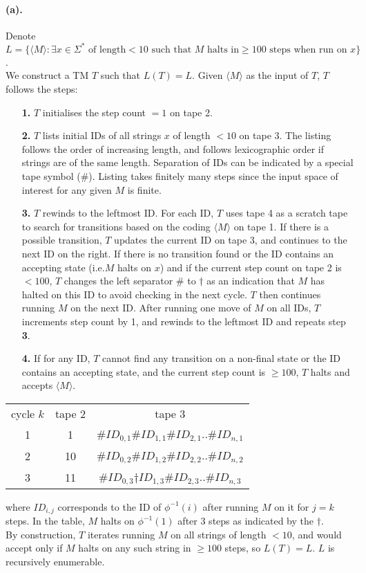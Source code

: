 \documentclass[12pt]{article}
\begin{document}
\paragraph*{(a).} Denote \(L = \{\langle M \rangle : \exists x \in \Sigma^* \text{ of length} < 10 \text{ such that } M \text{ halts in} \geq 100 \text{ steps when run on } x\}\).\\
We construct a TM \(T\) such that \(L(T) = L\). Given \(\langle M \rangle\) as the input of \(T\), \(T\) follows the steps:
\begin{enumerate}
  \item[\textbf{1.}] \(T\) initialises the step count \(= 1\) on tape 2.
  \item[\textbf{2.}] \(T\) lists initial IDs of all strings \(x\) of length \(< 10\) on tape 3. The listing follows the order of increasing length, and follows lexicographic order if strings are of the same length. Separation of IDs can be indicated by a special tape symbol (\#). Listing takes finitely many steps since the input space of interest for any given \(M\) is finite.
  \item[\textbf{3.}] \(T\) rewinds to the leftmost ID. For each ID, \(T\) uses tape 4 as a scratch tape to search for transitions based on the coding \(\langle M \rangle\) on tape 1. If there is a possible transition, \(T\) updates the current ID on tape 3, and continues to the next ID on the right. If there is no transition found or the ID contains an accepting state (i.e.\(M\) halts on \(x\)) and if the current step count on tape 2 is \(< 100\), \(T\) changes the left separator \# to \(\dagger\) as an indication that \(M\) has halted on this ID to avoid checking in the next cycle. \(T\) then continues running \(M\) on the next ID. After running one move of \(M\) on all IDs, \(T\) increments step count by 1, and rewinds to the leftmost ID and repeats step \textbf{3}. 
  \item[\textbf{4.}] If for any ID, \(T\) cannot find any transition on a non-final state or the ID contains an accepting state, and the current step count is \(\geq 100\), \(T\) halts and accepts \(\langle M \rangle\).
\end{enumerate}
\begin{center}
  \begin{tabular}{ c c c }
  cycle \(k\) & tape 2 & tape 3 \\
  1 & 1 & \#\(ID_{0,1}\)\#\(ID_{1,1}\)\#\(ID_{2,1}\)..\#\(ID_{n,1}\) \\
  2 & 10 & \#\(ID_{0,2}\)\#\(ID_{1,2}\)\#\(ID_{2,2}\)..\#\(ID_{n,2}\) \\
  3 & 11 & \#\(ID_{0,3}\)\(\dagger ID_{1,3}\)\#\(ID_{2,3}\)..\#\(ID_{n,3}\) \\
  \end{tabular}
\end{center}
where \(ID_{i, j}\) corresponds to the ID of \(\phi^{-1}(i)\) after running \(M\) on it for \(j = k\) steps. In the table, \(M\) halts on \(\phi^{-1}(1)\) after 3 steps as indicated by the \(\dagger\). \\
By construction, \(T\) iterates running \(M\) on all strings of length \(< 10\), and would accept only if \(M\) halts on any such string in \(\geq 100\) steps, so \(L(T) = L\). \(L\) is recursively enumerable.
\end{document}
